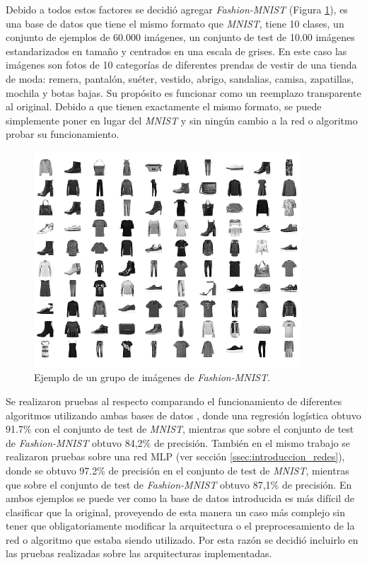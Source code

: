 \documentclass[spanish]{article}
\theoremstyle{definition}
\theoremstyle{remark}
\numberwithin{equation}{section}
\numberwithin{equation}{section} %
\begin{document}
Debido a todos estos factores se decidió agregar \textit{Fashion-MNIST} \cite{xiao2017fashion} (Figura \ref{fig:fashionMNIST}), es una base de datos que tiene el mismo formato que \textit{MNIST}, tiene 10 clases, un conjunto de ejemplos de 60.000 imágenes, un conjunto de test de 10.00 imágenes estandarizados en tamaño y centrados en una escala de grises. En este caso las imágenes son fotos de 10 categorías de diferentes prendas de vestir de una tienda de moda: remera, pantalón, suéter, vestido, abrigo, sandalias, camisa, zapatillas, mochila y botas bajas. Su propósito es funcionar como un reemplazo transparente al original. Debido a que tienen exactamente el mismo formato, se puede simplemente poner en lugar del \textit{MNIST} y sin ningún cambio a la red o algoritmo probar su funcionamiento. \par
\begin{figure}[H]
 \centering
 \includegraphics[width=10cm]{img/ejemplo_Fashion_MNIST.png}
\caption[Ejemplo \textit{Fashion-MNIST}]{\footnotesize{ Ejemplo de un grupo de imágenes de \textit{Fashion-MNIST}\cite{xiao2017fashion}.}}
\label{fig:fashionMNIST}
\end{figure}
Se realizaron pruebas al respecto comparando el funcionamiento de diferentes algoritmos utilizando ambas bases de datos \cite{xiao2017fashion}, donde una regresión logística obtuvo 91.7\% con el conjunto de test de \textit{MNIST}, mientras que sobre el conjunto de test de \textit{Fashion-MNIST} obtuvo 84,2\% de precisión. También en el mismo trabajo se realizaron pruebas sobre una red MLP (ver sección \ref{ssec:introduccion_redes}), donde se obtuvo 97.2\% de precisión en el conjunto de test de \textit{MNIST}, mientras que sobre el conjunto de test de \textit{Fashion-MNIST} obtuvo 87,1\% de precisión. En ambos ejemplos se puede ver como la base de datos introducida es más difícil de clasificar que la original, proveyendo de esta manera un caso más complejo sin tener que obligatoriamente modificar la arquitectura o el preprocesamiento de la red o algoritmo que estaba siendo utilizado. Por esta razón se decidió incluirlo en las pruebas realizadas sobre las arquitecturas implementadas.\par
\end{document}
